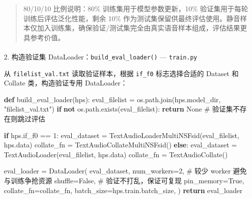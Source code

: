 \documentclass[
  english,
  letterpaper,
  DIV=11,
  numbers=noendperiod]{scrartcl}
\makeatletter
\let\oldparagraph\paragraph
\renewcommand{\paragraph}{
    \@ifstar
      \xxxParagraphStar
      \xxxParagraphNoStar
  }
\newcommand{\xxxParagraphStar}[1]{\oldparagraph*{#1}\mbox{}}
\newcommand{\xxxParagraphNoStar}[1]{\oldparagraph{#1}\mbox{}}
\newenvironment{Shaded}{\begin{snugshade}}{\end{snugshade}}
\newcommand{\CommentTok}[1]{\textcolor[rgb]{0.37,0.37,0.37}{#1}}
\newcommand{\ControlFlowTok}[1]{\textcolor[rgb]{0.00,0.23,0.31}{\textbf{#1}}}
\newcommand{\DecValTok}[1]{\textcolor[rgb]{0.68,0.00,0.00}{#1}}
\newcommand{\KeywordTok}[1]{\textcolor[rgb]{0.00,0.23,0.31}{\textbf{#1}}}
\newcommand{\NormalTok}[1]{\textcolor[rgb]{0.00,0.23,0.31}{#1}}
\newcommand{\OperatorTok}[1]{\textcolor[rgb]{0.37,0.37,0.37}{#1}}
\newcommand{\StringTok}[1]{\textcolor[rgb]{0.13,0.47,0.30}{#1}}
\newcommand{\VariableTok}[1]{\textcolor[rgb]{0.07,0.07,0.07}{#1}}
\makeatother
\begin{document}
\begin{quote}
80/10/10 比例说明：80\% 训练集用于模型参数更新，10\%
验证集用于每轮训练后评估泛化性能，剩余 10\%
作为测试集保留供最终评估使用。静音样本仅加入训练集，确保验证/测试集完全由真实语音样本组成，评估结果更具参考价值。
\end{quote}

\paragraph{\texorpdfstring{2. 构造验证集
DataLoader：\texttt{build\_eval\_loader()} ---
\texttt{train.py}}{2. 构造验证集 DataLoader：build\_eval\_loader() --- train.py}}\label{ux6784ux9020ux9a8cux8bc1ux96c6-dataloaderbuild_eval_loader-train.py}

从 \texttt{filelist\_val.txt} 读取验证样本，根据 \texttt{if\_f0}
标志选择合适的 Dataset 和 Collate 类，构造验证专用 DataLoader：

\begin{Shaded}
\begin{Highlighting}[]
\KeywordTok{def}\NormalTok{ build\_eval\_loader(hps):}
\NormalTok{    eval\_filelist }\OperatorTok{=}\NormalTok{ os.path.join(hps.model\_dir, }\StringTok{"filelist\_val.txt"}\NormalTok{)}
    \ControlFlowTok{if} \KeywordTok{not}\NormalTok{ os.path.exists(eval\_filelist):}
        \ControlFlowTok{return} \VariableTok{None}  \CommentTok{\# 验证集不存在则跳过评估}

    \ControlFlowTok{if}\NormalTok{ hps.if\_f0 }\OperatorTok{==} \DecValTok{1}\NormalTok{:}
\NormalTok{        eval\_dataset }\OperatorTok{=}\NormalTok{ TextAudioLoaderMultiNSFsid(eval\_filelist, hps.data)}
\NormalTok{        collate\_fn }\OperatorTok{=}\NormalTok{ TextAudioCollateMultiNSFsid()}
    \ControlFlowTok{else}\NormalTok{:}
\NormalTok{        eval\_dataset }\OperatorTok{=}\NormalTok{ TextAudioLoader(eval\_filelist, hps.data)}
\NormalTok{        collate\_fn }\OperatorTok{=}\NormalTok{ TextAudioCollate()}

\NormalTok{    eval\_loader }\OperatorTok{=}\NormalTok{ DataLoader(}
\NormalTok{        eval\_dataset,}
\NormalTok{        num\_workers}\OperatorTok{=}\DecValTok{2}\NormalTok{,                          }\CommentTok{\# 较少 worker 避免与训练争抢资源}
\NormalTok{        shuffle}\OperatorTok{=}\VariableTok{False}\NormalTok{,                          }\CommentTok{\# 验证不打乱，保证可复现}
\NormalTok{        pin\_memory}\OperatorTok{=}\VariableTok{True}\NormalTok{,}
\NormalTok{        collate\_fn}\OperatorTok{=}\NormalTok{collate\_fn,}
\NormalTok{        batch\_size}\OperatorTok{=}\NormalTok{hps.train.batch\_size,}
\NormalTok{    )}
    \ControlFlowTok{return}\NormalTok{ eval\_loader}
\end{Highlighting}
\end{Shaded}
\end{document}
